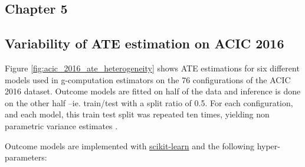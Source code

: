 \documentclass[french,12pt,twoside,a4paper]{book}
\begin{document}
\clearpage
\begin{appendices}



  \chapter{Chapter 5}\label{apd:causal_model_selection}


  \section{Variability of ATE estimation on ACIC 2016}%

  \label{apd:toy_example:acic_2016_ate_variability}%

  Figure \ref{fig:acic_2016_ate_heterogeneity} shows ATE estimations for six
  different models used in g-computation estimators on the 76 configurations of
  the ACIC 2016 dataset. Outcome models are fitted on half of the data and
  inference is done on the other half --ie. train/test with a split ratio of 0.5.
  For each configuration, and each model, this train test split was repeated ten
  times, yielding non parametric variance estimates
  \citep{bouthillier_accounting_2021}.

  Outcome models are implemented with
  \href{https://scikit-learn.org/stable/}{scikit-learn}
  \citep{pedregosa_scikitlearn_2011} and the following hyper-parameters:

  \begin{table}[h!]
    \centering
\end{table}
\end{appendices}
\end{document}
